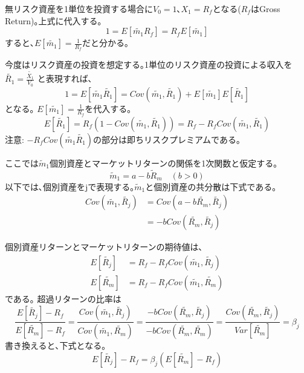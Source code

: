 \documentclass[uplatex,a4paper]{jsarticle}
\begin{document}
無リスク資産を1単位を投資する場合に$V_0 = 1$､$X_1 = R_f$となる($R_f$はGross Return)｡上式に代入する｡
\begin{equation*}
1 = E [\widetilde{m_1} R_f] = R_f E [\widetilde{m_1}]
\end{equation*}
すると､$\displaystyle E [\widetilde{m_1}] = \frac{1}{R_f}$だと分かる｡

今度はリスク資産の投資を想定する｡1単位のリスク資産の投資による収入を
$\displaystyle \widetilde{R_1} = \frac{\widetilde{X_1}}{V_0}$
と表現すれば､
\begin{equation*}
1 = E [\widetilde{m_1} \widetilde{R_1}] = Cov(\widetilde{m_1}, \widetilde{R_1}) +  E [\widetilde{m_1} ] E [ \widetilde{R_1}]
\end{equation*}
となる｡
$ E [\widetilde{m_1}] = \frac{1}{R_f}$を代入する｡
\begin{equation*}
E [ \widetilde{R_1}] = R_f \left ( 1- Cov(\widetilde{m_1}, \widetilde{R_1})\right ) =
R_f - R_f Cov(\widetilde{m_1}, \widetilde{R_1})
\end{equation*}
注意: $ - R_f Cov(\widetilde{m_1} \widetilde{R_1})$の部分は即ちリスクプレミアムである｡

ここでは$\widetilde m_1$個別資産とマーケットリターンの関係を1次関数と仮定する｡
\begin{equation*}
\widetilde m_1 = a -b \widetilde R_m   \quad  (b > 0)
\end{equation*}
以下では､個別資産をjで表現する｡$\widetilde m_1$と個別資産の共分散は下式である｡
\begin{align*}
Cov(\widetilde{m_1}, \widetilde{R_j})
& = Cov(a - b \widetilde{R_m}, \widetilde{R_j}) \\
& = - b  Cov( \widetilde{R_m}, \widetilde{R_j})
\end{align*}

個別資産リターンとマーケットリターンの期待値は､
\begin{align*}
E [ \widetilde{R_j}]
& = R_f - R_f Cov(\widetilde{m_1}, \widetilde{R_j}) \\
E [ \widetilde{R_m}]
& = R_f - R_f Cov(\widetilde{m_1}, \widetilde{R_m})
\end{align*}
である｡
超過リターンの比率は
\begin{equation*}
\frac{E [ \widetilde{R_j}] - R_f }{E [ \widetilde{R_m}] - R_f}
= \frac{Cov(\widetilde{m_1}, \widetilde{R_j})}{Cov(\widetilde{m_1}, \widetilde{R_m}) }
= \frac{-b Cov(\widetilde{R_m}, \widetilde{R_j})}{-b Cov(\widetilde{R_m}, \widetilde{R_m}) }
= \frac{Cov(\widetilde{R_m}, \widetilde{R_j})}{Var[\widetilde{R_m}]}
= \beta_j
\end{equation*}
書き換えると､下式となる｡
\begin{equation*}
E [ \widetilde{R_j}] - R_f = \beta_j (E [ \widetilde{R_m}] - R_f)
\end{equation*}
\end{document}
